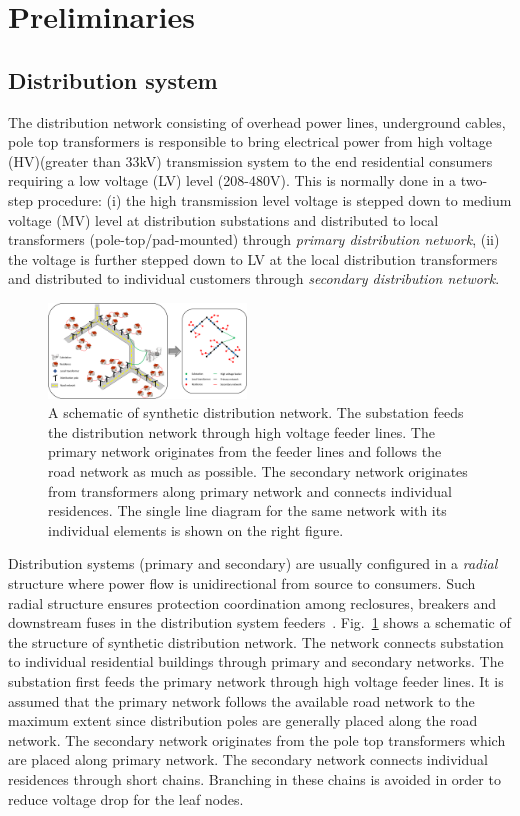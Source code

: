 \documentclass[sigconf]{acmart}
\begin{document}
\section{Preliminaries}\label{sec:prelim}
\subsection{Distribution system}\label{ssec:dist}
The distribution network consisting of overhead power lines, underground cables, pole top transformers is responsible to bring electrical power from high voltage (HV)(greater than 33kV) transmission system to the end residential consumers requiring a low voltage (LV) level (208-480V). This is normally done in a two-step procedure: (i) the high transmission level voltage is stepped down to medium voltage (MV) level at distribution substations and distributed to local transformers (pole-top/pad-mounted) through \emph{primary distribution network}, (ii) the voltage is further stepped down to LV at the local distribution transformers and distributed to individual customers through \emph{secondary distribution network}. 

\begin{figure}
	\centering
	\includegraphics[width=0.47\textwidth]{figs/teaser.png}
	\caption{A schematic of synthetic distribution network. The substation feeds the distribution network through high voltage feeder lines. The primary network originates from the feeder lines and follows the road network as much as possible. The secondary network originates from transformers along primary network and connects individual residences. The single line diagram for the same network with its individual elements is shown on the right figure.}
	\label{fig:teaser}
\end{figure}
Distribution systems (primary and secondary) are usually configured in a \emph{radial} structure where power flow is unidirectional from source to consumers. Such radial structure ensures protection coordination among reclosures, breakers and downstream fuses in the distribution system feeders~\cite{rad_prot}. Fig.~\ref{fig:teaser} shows a schematic of the structure of synthetic distribution network. The network connects substation to individual residential buildings through primary and secondary networks. The substation first feeds the primary network through high voltage feeder lines. It is assumed that the primary network follows the available road network to the maximum extent since distribution poles are generally placed along the road network. The secondary network originates from the pole top transformers which are placed along primary network. The secondary network connects individual residences through short chains. Branching in these chains is avoided in order to reduce voltage drop for the leaf nodes.
\end{document}
